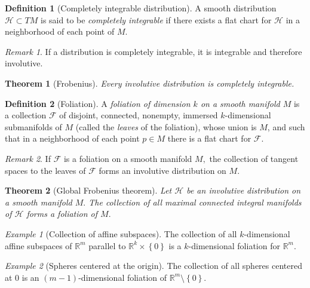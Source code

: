 \documentclass [xcolor=svgnames, t] {beamer}
\theoremstyle{definition}
\newtheorem{df}{Definition}
\theoremstyle{plain}
\newtheorem{thm}{Theorem}
\theoremstyle{remark}
\newtheorem{ex}{Example}
\newtheorem{rem}{Remark}
\begin{document}
\begin{frame}[fragile]
	\begin{df}[Completely integrable distribution]
	A smooth distribution $ \mathcal{H}\subset TM $  is said to be \textit{completely integrable} if there exists a flat chart for $ \mathcal{H} $ in a neighborhood of each point of $ M. $ 
\end{df}
\begin{rem}
	If a distribution is completely integrable, it is integrable and therefore involutive.
\end{rem}
\begin{thm}[Frobenius]
	Every involutive distribution is completely integrable.	
\end{thm}
\end{frame}

\begin{frame}
\begin{df}[Foliation]
	A \textit{foliation of dimension $ k $ on a smooth manifold $ M $} is a collection $ \mathcal{F} $ of disjoint, connected, nonempty, immersed $ k $-dimensional submanifolds of $ M $ (called the \textit{leaves} of the foliation), whose union is $ M $, and such that in a neighborhood of each point $ p\in M $ there is a flat chart for $ \mathcal{F}. $  
\end{df}
\begin{rem}
	If $ \mathcal{F} $ is a foliation on a smooth manifold $ M, $ the collection of tangent spaces to the leaves of $ \mathcal{F} $ forms an involutive distribution on $ M. $
\end{rem}
\begin{thm}[Global Frobenius theorem]
	Let $ \mathcal{H} $ be an involutive distribution on a smooth manifold $ M. $ The collection of all maximal connected integral manifolds of $ \mathcal{H} $ forms a foliation of $ M. $ 
\end{thm}
\begin{ex}[Collection of affine subspaces]
	The collection of all $ k $-dimensional affine subspaces of $ \mathbb{R}^m $ parallel to $ \mathbb{R}^k\times \left\{ 0 \right\} $ is a $ k $-dimensional foliation for $ \mathbb{R}^m. $ 
\end{ex}

\begin{ex}[Spheres centered at the origin]
	The collection of all spheres centered at $ 0 $ is an $ (m-1) $-dimensional foliation of $ \mathbb{R}^m\setminus \left\{ 0 \right\} $. 
\end{ex}


\end{frame}
\end{document}
